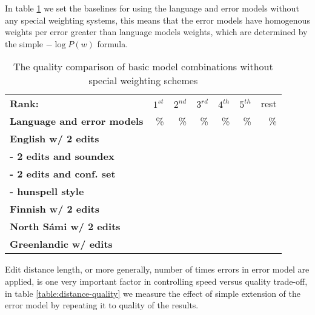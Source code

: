 \documentclass[a4paper,12pt]{article}
\begin{document}
In table \ref{table:baseline-quality} we set the baselines for using the
language and error models without any special weighting systems, this means
that the error models have homogenous weights per error greater than language
models weights, which are determined by the simple $-\log P(w)$ formula.

\begin{table}
    \centering
    \begin{tabular}{|l|r|r|r|r|r|r|}
        \hline
        \bf Rank: & $1^{st}$ & $2^{nd}$ & $3^{rd}$ & $4^{th}$ & $5^{th}$ & rest \\
        \bf Language and error models &  \% & \% & \% & \% & \% & \% \\
        \hline
        \bf English w/ 2 edits & & & & & & \\
     \bf - 2 edits and soundex & & & & & & \\
   \bf - 2 edits and conf. set & & & & & & \\
          \bf - hunspell style & & & & & & \\
        \hline
        \bf Finnish w/ 2 edits & & & & & \\
        \hline
        \bf North Sámi w/ 2 edits & & & & & \\
        \hline
        \bf Greenlandic w/ edits & & & & & \\
        \hline
    \end{tabular}
    \caption{The quality comparison of basic model combinations without special
    weighting schemes\label{table:baseline-quality}}
\end{table}

Edit distance length, or more generally, number of times errors in error model
are applied, is one very important factor in controlling speed versus
quality trade-off, in table \ref{table:distance-quality} we measure the effect
of simple extension of the error model by repeating it to quality of the
results.
\end{document}
